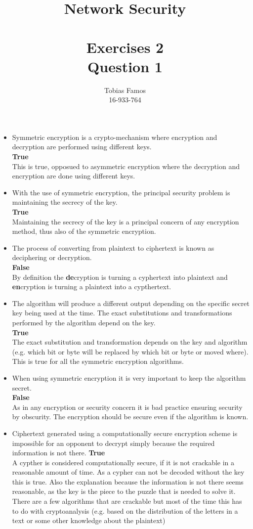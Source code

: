 \documentclass[11pt,a4paper]{article}
\title{Network Security \\ ~\\ \Large{Exercises 2 \\Question 1}}
\author{Tobias Famos\\ 16-933-764}
\begin{document}
    \maketitle
    \begin{itemize}
        \item{Symmetric encryption is a crypto-mechanism where encryption and decryption are performed using different keys.}\\
        \textbf{True}\\
        This is true, opposued to asymmetric encryption where the decryption and encryption are done using different keys.
        \item{With the use of symmetric encryption, the principal security problem is maintaining the secrecy of the key.}\\
        \textbf{True}\\
        Maintaining the secrecy of the key is a principal concern of any encryption method, thus also of the symmetric encryption.
        \item{The process of converting from plaintext to ciphertext is known as deciphering or decryption.}\\
        \textbf{False}\\
        By definition the \textbf{de}cryption is turning a cyphertext into plaintext and \textbf{en}cryption is turning a plaintext into a cypthertext. 
        \item{The algorithm will produce a different output depending on the specific secret key being used at the time.
        The exact substitutions and transformations performed by the algorithm depend on the key.}\\
        \textbf{True}\\
        The exact substitution and transformation depends on the key and algorithm (e.g. which bit or byte will be replaced by which bit or byte or moved where).
        This is true for all the symmetric encryption algorithms.
        \item{When using symmetric encryption it is very important to keep the algorithm secret.}\\
        \textbf{False}\\
        As in any encryption or security concern it is bad practice ensuring security by obscurity.
        The encryption should be secure even if the algorithm is known.
        \item{Ciphertext generated using a computationally secure encryption scheme is impossible for an opponent to decrypt simply because the required information is not there.}
        \textbf{True}\\
        A cypther is considered computationally secure, if it is not crackable in a reasonable amount of time.
        As a cypher can not be decoded without the key this is true.
        Also the explanation because the information is not there seems reasonable, as the key is the piece to the puzzle that is needed to solve it.
        There are a few algorithms that are crackable but most of the time this has to do with cryptoanalysis (e.g. based on the distribution of the letters in a text or some other knowledge about the plaintext)
    \end{itemize}
\end{document}
